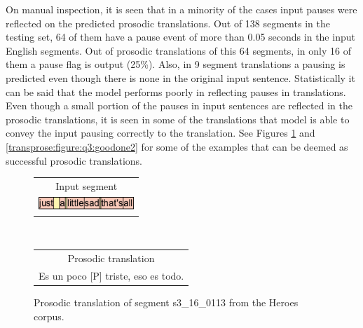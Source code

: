 On manual inspection, it is seen that in a minority of the cases input pauses were reflected on the predicted prosodic translations. Out of 138 segments in the testing set, 64 of them have a pause event of more than 0.05 seconds in the input English segments. Out of prosodic translations of this 64 segments, in only 16 of them a pause flag is output (25\%). Also, in 9 segment translations a pausing is predicted even though there is none in the original input sentence. Statistically it can be said that the model performs poorly in reflecting pauses in translations. 
Even though a small portion of the pauses in input sentences are reflected in the prosodic translations, it is seen in some of the translations that model is able to convey the input pausing correctly to the translation. See Figures \ref{transprose:figure:q3:goodone1} and \ref{transprose:figure:q3:goodone2} for some of the examples that can be deemed as successful prosodic translations. 

\begin{figure}[h!]
\centering
\begin{minipage}[t]{0.37\textwidth}
\begin{tabular}{c}
Input segment \\
\includegraphics[height=0.5cm]{img/s3_16_0113.png} \\
\end{tabular}
\end{minipage}
\\
\begin{minipage}[t]{0.4\textwidth}
\begin{tabular}{c}
Prosodic translation \\
Es un poco [P] triste, eso es todo. \\
\end{tabular}
\end{minipage}
\caption{Prosodic translation of segment s3\_16\_0113 from the Heroes corpus.}
\label{transprose:figure:q3:goodone1}
\end{figure}

